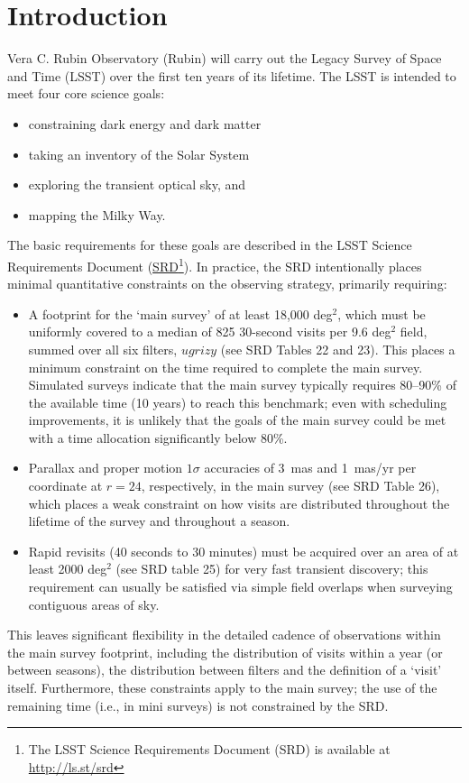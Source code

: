 \section{Introduction}

Vera C. Rubin Observatory (Rubin) will carry out the Legacy Survey of Space and Time (LSST) over the first ten years of its lifetime. The LSST is intended to meet four core science goals:
\begin{itemize}
\item constraining dark energy and dark matter
\item taking an inventory of the Solar System
\item exploring the transient optical sky, and
\item mapping the Milky Way.
\end{itemize}

The basic requirements for these goals are described in the LSST Science Requirements Document (\href{http://ls.st/srd}{SRD}\footnote{The LSST Science 
Requirements Document (SRD) is available at \href{http://ls.st/srd}{http://ls.st/srd}}). In practice, the SRD intentionally places minimal quantitative constraints 
on the observing strategy, primarily requiring:
\begin{itemize} 
\item A footprint for the `main survey' of at least 18,000 deg$^2$, which must be uniformly covered to 
a median of 825 30-second visits per 9.6 deg$^2$ field, summed over all six filters, $ugrizy$ (see SRD 
Tables 22 and 23). This places a minimum constraint on the time required to complete 
the main survey. Simulated surveys indicate that the main survey typically requires 80--90\% 
of the available time (10 years) to reach this benchmark; even with scheduling improvements, it is unlikely 
that the goals of the main survey could be met with a time allocation significantly below 80\%. 
\item Parallax and proper motion $1\sigma$ accuracies of 3~mas and 1~mas/yr per coordinate at $r=24$, 
respectively, in the main survey (see SRD Table 26), which places
a weak constraint on how visits are distributed throughout the lifetime of the survey and throughout a season.
\item Rapid revisits (40 seconds to 30 minutes) must be acquired over an area of at least 2000 deg$^2$ (see SRD table 25) for
very fast transient discovery; this requirement can usually be satisfied via simple field overlaps when surveying contiguous areas of sky. 
\end{itemize}
This leaves significant flexibility in the detailed cadence of observations within
the main survey footprint, including the distribution of visits within a year (or between seasons), the distribution between filters and 
the definition of a `visit' itself. Furthermore, these constraints apply to the main survey; the use of the 
remaining time (i.e., in mini surveys) is not constrained by the SRD.

